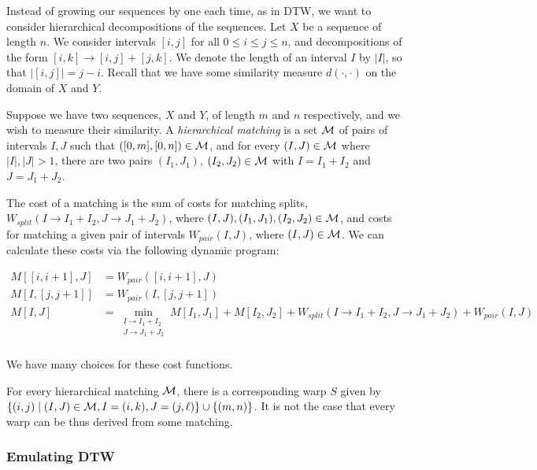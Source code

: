 Instead of growing our sequences by one each time, as in DTW, we want
to consider hierarchical decompositions of the sequences. Let $X$ be a
sequence of length $n$. We consider intervals $[i,j]$ for all $0\le i
\le j \le n$, and decompositions of the form $[i,k] \to [i,j] +
[j,k]$.  We denote the length of an interval $I$ by $|I|$, so that
$|[i,j]| = j-i$. Recall that we have some similarity measure
$d(\cdot,\cdot)$ on the domain of $X$ and $Y$.

Suppose we have two sequences, $X$ and $Y$, of length $m$ and $n$
respectively, and we wish to measure their similarity. A {\em
  hierarchical matching} is a set ${\mathcal M}$ of pairs of intervals $I,J$
such that $([0,m], [0,n])\in {\mathcal M}$, and for every $(I,J) \in {\mathcal M}$
where $|I|, |J|> 1$, there are two pairs $(I_1, J_1)$, $(I_2, J_2)\in
{\mathcal M}$ with $I=I_1 + I_2$ and $J=J_1 + J_2$.

The cost of a matching is the sum of costs for matching splits,
$W_{split}(I\to I_1 + I_2, J\to J_1 + J_2)$, where $(I,J), (I_1,J_1),
(I_2,J_2)\in {\mathcal M}$, and costs for matching a given pair of intervals
$W_{pair}(I,J)$, where $(I,J)\in {\mathcal M}$.
We can calculate these costs via the following dynamic program:

\begin{align*}
M[[i,i+1],J] &= W_{pair}([i, i+1],J)\\
M[I,[j, j+1]] &= W_{pair}(I,[j,j+1])\\
M[I,J] &= \min_{\substack{I\to I_1 + I_2 \\ J\to J_1 + J_2}} 
M[I_1, J_1] + M[I_2, J_2] + W_{split}(I\to I_1 + I_2, J\to J_1 + J_2) + W_{pair}(I,J)\\
\end{align*}

We have many choices for these cost functions.

For every hierarchical matching ${\mathcal M}$, there is a corresponding warp
$S$ given by $\{(i,j) \mid (I,J)\in {\mathcal M}, I=(i,k), J=(j,\ell)\} \cup
\{(m,n)\}$. It is not the case that every warp can be thus derived
from some matching.

\subsubsection{Emulating DTW}

